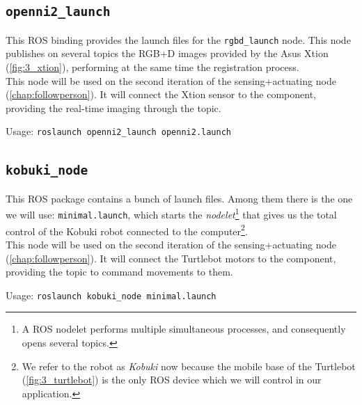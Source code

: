 	\subsection{\texttt{openni2\_launch}}
		This ROS binding \cite{openni2-doc} provides the launch files for the \texttt{rgbd\_launch} node. This node publishes on several topics the RGB+D images provided by the Asus Xtion (\autoref{fig:3_xtion}), performing at the same time the registration process.\\
		
		This node will be used on the second iteration of the sensing+actuating node (\autoref{chap:followperson}). It will connect the Xtion sensor to the component, providing the real-time imaging through the topic.\\

		\begin{center}
			Usage: \texttt{roslaunch openni2\_launch openni2.launch}
		\end{center}
		

	\subsection{\texttt{kobuki\_node}}
		This ROS package contains a bunch of launch files. Among them there is the one we will use: \texttt{minimal.launch}, which starts the \emph{nodelet}\footnote{A ROS nodelet performs multiple simultaneous processes, and consequently opens several topics.} that gives us the total control of the Kobuki robot connected to the computer\footnote{We refer to the robot as \emph{Kobuki} now because the mobile base of the Turtlebot (\autoref{fig:3_turtlebot}) is the only ROS device which we will control in our application.}.\\
		
		This node will be used on the second iteration of the sensing+actuating node (\autoref{chap:followperson}). It will connect the Turtlebot motors to the component, providing the topic to command movements to them.
		
		\begin{center}
			Usage: \texttt{roslaunch kobuki\_node minimal.launch}
		\end{center}

	
